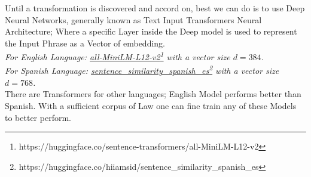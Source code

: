 \documentclass[a4paper,fleqn]{cas-sc}
\begin{document}
\noindent
Until a transformation is discovered and accord on, best we can do is to use Deep Neural Networks, 
generally known as Text Input Transformers Neural Architecture; Where a specific Layer inside the Deep model 
is used to represent the Input Phrase as a Vector of embedding. \\
\textit{For English Language: \href{https://huggingface.co/sentence-transformers/all-MiniLM-L12-v2}{all-MiniLM-L12-v2}\footnote{https://huggingface.co/sentence-transformers/all-MiniLM-L12-v2} with a vector size $d=384$.}\\
\textit{For Spanish Language: \href{https://huggingface.co/hiiamsid/sentence_similarity_spanish_es}{sentence\_similarity\_spanish\_es}\footnote{https://huggingface.co/hiiamsid/sentence\_similarity\_spanish\_es} with a vector size $d=768$.}\\

There are Transformers for other languages; English Model performs better than Spanish. 
With a sufficient corpus of Law one can fine train any of these Models to better perform. 
\end{document}
